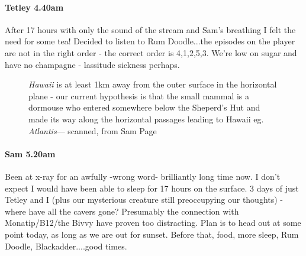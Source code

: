 \paragraph{Tetley 4.40am}
After 17 hours with only the sound of the stream and Sam’s breathing I felt the need for some tea! Decided to listen to Rum Doodle...the episodes on the player are not in the right order - the correct order is 4,1,2,5,3. We’re low on sugar and have no champagne - lassitude sickness perhaps.

\begin{figure}[t!]
\checkoddpage \ifoddpage \forcerectofloat \else \forceversofloat \fi
\centering
{}
\caption{\emph{Hawaii} is at least 1km away from the outer surface in the horizontal plane - our current hypothesis is that the small mammal is a dormouse who entered somewhere below the Sheperd's Hut and made its way along the horizontal passages leading to Hawaii eg. \emph{Atlantis}--- scanned, from Sam Page }
\label{the creature}
\end{figure}

\paragraph{Sam 5.20am}
Been at x-ray for an awfully -wrong word- brilliantly long time now. I don't expect I would have been able to sleep for 17 hours on the surface. 3 days of just Tetley and I (plus our mysterious creature still preoccupying our thoughts) - where have all the cavers gone? Presumably the connection with Monatip/B12/the Bivvy have proven too distracting. Plan is to head out at some point today, as long as we are out for sunset. Before that, food, more sleep, Rum Doodle, Blackadder....good times.


